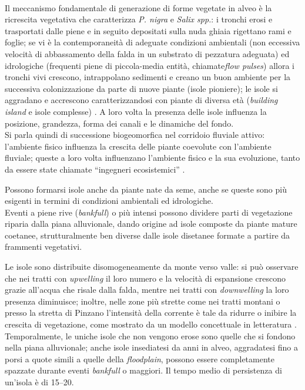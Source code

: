 %
\\
Il meccanismo fondamentale di generazione di forme vegetate in alveo è la ricrescita vegetativa che caratterizza \emph{P. nigra} e \emph{Salix spp.}: i tronchi erosi e trasportati dalle piene e in seguito depositati sulla nuda ghiaia rigettano rami e foglie;
se vi è la contemporaneità di adeguate condizioni ambientali (non eccessiva velocità di abbassamento della falda in un substrato di pezzatura adeguata) ed idrologiche (frequenti piene di piccola-media entità, chiamate\emph{flow pulses}) allora i tronchi vivi crescono, intrappolano sedimenti e creano un buon ambiente per la successiva colonizzazione da parte di nuove piante (isole pioniere);
le isole si aggradano e accrescono caratterizzandosi con piante di diversa età (\emph{building island} e isole complesse) .
A loro volta la presenza delle isole influenza la posizione, grandezza, forma dei canali e le dinamiche del fondo.
\\
Si parla quindi di successione biogeomorfica nel corridoio fluviale attivo: l'ambiente fisico influenza la crescita delle piante coevolute con l'ambiente fluviale; queste a loro volta influenzano l'ambiente fisico e la sua evoluzione, tanto da essere state chiamate “ingegneri ecosistemici” .

Possono formarsi isole anche da piante nate da seme, anche se queste sono più esigenti in termini di condizioni ambientali ed idrologiche.
\\
Eventi a piene rive (\emph{bankfull}) o più intensi possono dividere parti di vegetazione riparia dalla piana alluvionale, dando origine ad isole composte da piante mature coetanee, strutturalmente ben diverse dalle isole disetanee formate a partire da frammenti vegetativi.

Le isole sono distribuite disomogeneamente da monte verso valle: si può osservare che nei tratti con \emph{upwelling} il loro numero e la velocità di espansione crescono grazie all'acqua che risale dalla falda, mentre nei tratti con \emph{downwelling} la loro presenza diminuisce;
inoltre, nelle zone più strette come nei tratti montani o presso la stretta di Pinzano l'intensità della corrente è tale da ridurre o inibire la crescita di vegetazione, come mostrato da un modello concettuale in letteratura .
\\
Temporalmente, le uniche isole che non vengono erose sono quelle che si fondono nella piana alluvionale; anche isole insediatesi da anni in alveo, aggradatesi fino a porsi a quote simili a quelle della \emph{floodplain}, possono essere completamente spazzate durante eventi \emph{bankfull} o maggiori.
Il tempo medio di persistenza di un'isola è di \SIrange[range-phrase={-}]{15}{20}{\anni}.



